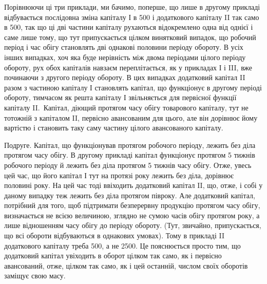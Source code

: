 Порівнюючи ці три приклади, ми бачимо, поперше, що лише в другому
прикладі відбувається послідовна зміна капіталу І в 500
і додаткового капіталу II так само в 500, так що ці дві частини
капіталу рухаються відокремлено одна від однієї і саме лише тому, що
тут припускається цілком винятковий випадок, що робочий період і час
обігу становлять дві однакові половини періоду обороту. В усіх інших
випадках, хоч яка буде нерівність між двома періодами цілого періоду
обороту, рух обох капіталів навзаєм переплітається, як у прикладах
І і III, вже починаючи з другого періоду обороту. В цих випадках додатковий
капітал II разом з частиною капіталу І становлять капітал, що функціонує
в другому періоді обороту, тимчасом як решта капіталу І звільняється
для первісної функції капіталу II.~Капітал, діющий протягом часу
обігу товарового капіталу, тут не тотожній з капіталом II, первісно авансованим
для цього, але він дорівнює йому вартістю і становить таку саму
частину цілого авансованого капіталу.

Подруге. Капітал, що функціонував протягом робочого періоду,
лежить без діла протягом часу обігу. В другому прикладі капітал функціонує
протягом 5 тижнів робочого періоду й лежить без діла протягом
5 тижнів часу обігу. Отже, увесь цей час, що його капітал І тут на протязі
року лежить без діла, дорівнює половині року. На цей час тоді ввіходить
додатковий капітал II, що, отже, і собі у даному випадку теж лежить без діла
протягом півроку. Але додатковий капітал, потрібний для того, щоб підтримати
безперервну продукцію протягом часу обігу, визначається не
всією величиною, зглядно не сумою часів обігу протягом року, а лише
відношенням часу обігу до періоду обороту. (Тут, звичайно, припускається,
що всі обороти відбуваються в однакових умовах). Тому в прикладі
II додаткового капіталу треба 500, а не 2500.
Це пояснюється просто тим, що додатковий капітал увіходить в оборот
цілком так само, як і первісно авансований, отже, цілком так само, як
і цей останній, числом своїх оборотів заміщує свою масу.

